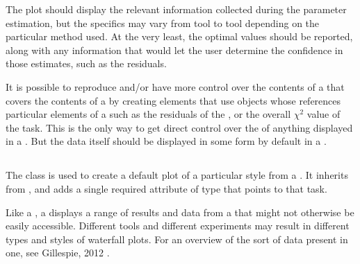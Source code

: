 \begin{blockChanged}
The plot should display the relevant information collected during the parameter estimation, but the specifics may vary from tool to tool depending on the particular method used.  At the very least, the optimal \AdjustableParameter values should be reported, along with any information that would let the user determine the confidence in those estimates, such as the residuals.

It is possible to reproduce and/or have more control over the contents of a \Plot that covers the contents of a \ParameterEstimationTask by creating \DataGenerator elements that use \DependentVariable objects whose  references particular elements of a \ParameterEstimationTask such as the residuals of the \Objective, or the overall $\chi^2$ value of the task.  This is the only way to get direct control over the \Style of anything displayed in a \ParameterEstimationResultsPlot.  But the data itself should be displayed in some form by default in a \ParameterEstimationReport.


\subsection{}
\label{class:waterfallPlot}
The \WaterfallPlot class is used to create a default plot of a particular style from a \ParameterEstimationTask.  It inherits from \Plot, and adds a single required attribute  of type \SIdRef that points to that task.

Like a \ParameterEstimationResultsPlot, a \WaterfallPlot displays a range of results and data from a \ParameterEstimationTask that might not otherwise be easily accessible.  Different tools and different experiments may result in different types and styles of waterfall plots.  For an overview of the sort of data present in one, see Gillespie, 2012 \citep{gillespie2012}.


\end{blockChanged}
